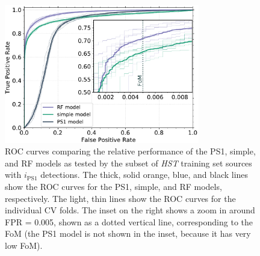 \documentclass[twocolumn, dvipdfmx]{aastex62}
\begin{document}
\begin{figure}[t]
 \centering
  \includegraphics[width=3.35in]{./Figures/CV_ROC_HST.pdf}
  \caption{ ROC curves comparing the relative performance of the PS1,
  simple, and RF models as tested by the subset of \textit{HST} training set
  sources with $i_\mathrm{PS1}$ detections. The thick, solid orange, blue,
  and black lines show the ROC curves for the PS1, simple, and RF models,
  respectively. The light, thin lines show the ROC curves for the individual
  CV folds. The inset on the right shows a zoom in around FPR = 0.005, shown
  as a dotted vertical line, corresponding to the FoM (the PS1 model is not
  shown in the inset, because it has very low FoM). }
  \label{fig:cvroc_hst}
\end{figure}

\end{document}
